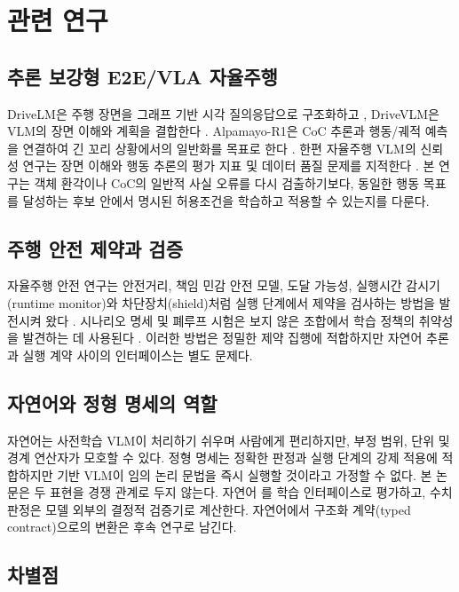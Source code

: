 \section{관련 연구}
\label{sec:related}

\subsection{추론 보강형 E2E/VLA 자율주행}

DriveLM은 주행 장면을 그래프 기반 시각 질의응답으로 구조화하고 \cite{sima2024drivelm}, DriveVLM은 VLM의 장면 이해와 계획을 결합한다 \cite{tian2024drivevlm}. Alpamayo-R1은 CoC 추론과 행동/궤적 예측을 연결하여 긴 꼬리 상황에서의 일반화를 목표로 한다 \cite{wang2025alpamayo}. 한편 자율주행 VLM의 신뢰성 연구는 장면 이해와 행동 추론의 평가 지표 및 데이터 품질 문제를 지적한다 \cite{xie2025drivebench}. 본 연구는 객체 환각이나 CoC의 일반적 사실 오류를 다시 검출하기보다, 동일한 행동 목표를 달성하는 후보 안에서 명시된 허용조건을 학습하고 적용할 수 있는지를 다룬다.

\subsection{주행 안전 제약과 검증}

자율주행 안전 연구는 안전거리, 책임 민감 안전 모델, 도달 가능성, 실행시간 감시기(runtime monitor)와 차단장치(shield)처럼 실행 단계에서 제약을 검사하는 방법을 발전시켜 왔다 \cite{shalev2017rss,katz2019marabou}. 시나리오 명세 및 폐루프 시험은 보지 않은 조합에서 학습 정책의 취약성을 발견하는 데 사용된다 \cite{fremont2019scenic,zhang2023cat}. 이러한 방법은 정밀한 제약 집행에 적합하지만 자연어 추론과 실행 계약 사이의 인터페이스는 별도 문제다.

\subsection{자연어와 정형 명세의 역할}

자연어는 사전학습 VLM이 처리하기 쉬우며 사람에게 편리하지만, 부정 범위, 단위 및 경계 연산자가 모호할 수 있다. 정형 명세는 정확한 판정과 실행 단계의 강제 적용에 적합하지만 기반 VLM이 임의 논리 문법을 즉시 실행할 것이라고 가정할 수 없다. 본 논문은 두 표현을 경쟁 관계로 두지 않는다. 자연어 \sccoc{}를 학습 인터페이스로 평가하고, 수치 판정은 모델 외부의 결정적 검증기로 계산한다. 자연어에서 구조화 계약(typed contract)으로의 변환은 후속 연구로 남긴다.

\subsection{차별점}

